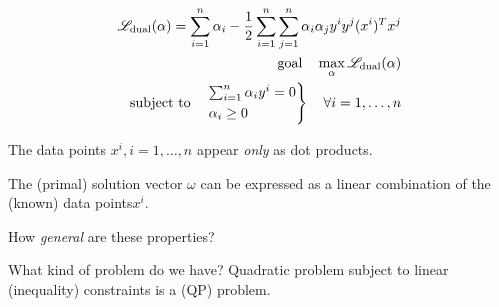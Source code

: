 
\begin{align*}
	\mathscr{L}_\text{dual}(\alpha) = \sum_{i=1}^n \alpha_i - \frac{1}{2} \sum_{i=1}^n \sum_{j=1}^n \alpha_i \alpha_j y^i y^j (x^i)^T x^j \\
	\text{goal} \quad \max_{\alpha} \mathscr{L}_\text{dual}(\alpha)                                                                       \\
	\text{subject to} \quad
	\begin{rcases*}
		\sum_{i=1}^n \alpha_i y^i = 0 \\
		\alpha_i \geq 0
	\end{rcases*} \quad \forall i=1,\dots,n
\end{align*}

\begin{note}{}{}
	The data points $x^i, i=1,\dots,n$  appear \emph{only} as
	dot products.
\end{note}

\begin{note}{}{}
	The (primal) solution vector $\omega$
	can be expressed as a linear combination of the (known) data points$x^i$.
\end{note}


\begin{question}{}{}
	How \emph{general} are these properties?
\end{question}

\begin{question}{What kind of problem do we have?}{}
	Quadratic problem subject to linear (inequality) constraints is
	a  (QP) problem.
\end{question}

